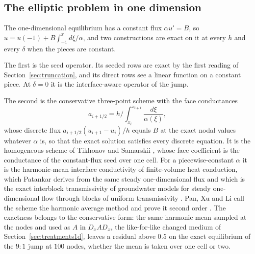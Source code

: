 \documentclass[11pt]{amsart}
\theoremstyle{definition}
\theoremstyle{remark}
\begin{document}
\subsection{The elliptic problem in one dimension}
\label{sec:elliptic1d}
The one-dimensional equilibrium has a constant flux $\alpha u' = B$, so
$u = u(-1) + B \int_{-1}^{x} d\xi / \alpha$, and two constructions are
exact on it at every $h$ and every $\delta$ when the pieces are constant.

The first is the seed operator. Its seeded rows are exact by the first
reading of Section~\ref{sec:truncation}, and its direct rows see a
linear function on a constant piece. At $\delta = 0$ it is the
interface-aware operator of the jump.

The second is the conservative three-point scheme with the face
conductances
\begin{equation}
  \label{eq:faceconductance}
  a_{i+1/2} = h \Big/ \int_{x_i}^{x_{i+1}} \frac{d\xi}{\alpha(\xi)},
\end{equation}
whose discrete flux $a_{i+1/2} (u_{i+1} - u_i) / h$ equals $B$ at the
exact nodal values whatever $\alpha$ is, so that the exact solution
satisfies every discrete equation. It is the homogeneous scheme of
Tikhonov and Samarskii \cite{TikhonovSamarskii1962,Samarskii2001}, whose
face coefficient is the conductance of the constant-flux seed over one
cell. For a piecewise-constant $\alpha$ it is the harmonic-mean interface
conductivity of finite-volume heat conduction, which Patankar derives from
the same steady one-dimensional flux \cite[\S4.2-3]{Patankar1980} and which
is the exact interblock transmissivity of groundwater models for steady
one-dimensional flow through blocks of uniform transmissivity
\cite{GoodeAppel1992}. Pan, Xu and Li call the scheme
the harmonic average method and prove it second order
\cite{PanXuLi2026}. The exactness belongs to the conservative form: the
same harmonic mean sampled at the nodes and used as $A$ in $D_x A D_x$,
the like-for-like changed medium of Section~\ref{sec:treatments1d}, leaves
a residual above $0.5$ on the exact equilibrium of the $9 : 1$ jump at
$100$ nodes, whether the mean is taken over one cell or two.
\end{document}
